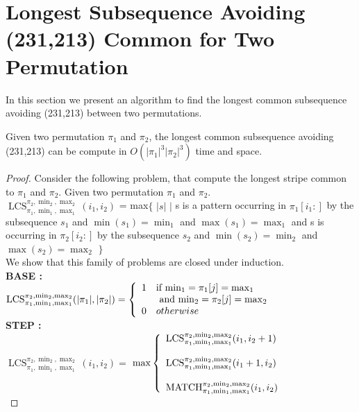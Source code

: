 \documentclass[a4paper]{llncs}
\DeclareMathOperator{\LCSa}{LCS}
\newcommand{\LCS}[8]{\LCSa_{{#1},{#2},{#3}}^{{#4},{#5},{#6}}({#7},{#8})}
\DeclareMathOperator{\matcha}{MATCH}
\newcommand{\match}[8]{\matcha_{{#1},{#2},{#3}}^{{#4},{#5},{#6}}({#7},{#8})}
\begin{document}
	\section{Longest Subsequence Avoiding \\(231,213) Common for Two Permutation}
	
	In this section we present an algorithm to find 
	the longest common subsequence avoiding (231,213) 
	between two permutations.\\

	\begin{proposition}
	Given two permutation $\pi_1$ and $\pi_2$,
	the longest common subsequence
	avoiding (231,213) can be compute in $O(|\pi_1|^3|\pi_2|^3)$ time and space.	
	\end{proposition}
	
	\begin{proof}
	Consider the following problem, 
	that compute the longest stripe common to $\pi_1$ and $\pi_2$.
	Given two permutation $\pi_1$ and $\pi_2$.\\
	
	$\LCS{\pi_1}{\min_1}{\max_1}{\pi_2}{\min_2}{\max_2}{i_1}{i_2}$
	= max$\{$ $|s|$ $|$ 
	s is a pattern occurring 
	in  $\pi_1[i_1:]$
	by the subsequence $s_1$ and $\min(s_1)=\min_1$ and $\max(s_1)=\max_1$
	and s is occurring
	in  $\pi_2[i_2:]$
	by the subsequence $s_2$ and $\min(s_2)=\min_2$ and $\max(s_2)=\max_2$	
	$\}$\\
	
	We show that this family of problems are closed under induction.\\


	\textbf{BASE :} \\
	$	\LCS{\pi_1}{\min_1}{\max_1}{\pi_2}{\min_2}{\max_2}{|\pi_1|}{|\pi_2|} = \left\{ 
			\begin{array}{l l}
				1 & \text{if $\min_1=\pi_1[j]=\max_1$  
				}\\
				& \text{ and $\min_2=\pi_2[j]=\max_2$}\\
				0 & otherwise\\
			\end{array} \right. $\\	

	\textbf{STEP :} \\	
	
	$\LCS{\pi_1}{\min_1}{\max_1}{\pi_2}{\min_2}{\max_2}{i_1}{i_2}
	=$
	$ \max \left\{ 
			\begin{array}{l l}
				\LCS{\pi_1}{\min_1}{\max_1}{\pi_2}{\min_2}{\max_2}{i_1}{i_2+1} \\
				\\
				\LCS{\pi_1}{\min_1}{\max_1}{\pi_2}{\min_2}{\max_2}{i_1+1}{i_2} \\
				\\
				\match{\pi_1}{\min_1}{\max_1}{\pi_2}{\min_2}{\max_2}{i_1}{i_2}
			\end{array} \right. $\vspace{20pt}\\	
	

\end{proof}
\end{document}
